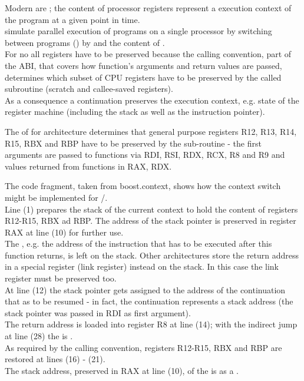 \label{mechanism}

Modern  are ; the content of
processor registers represent a execution context of the program at a given
point in time.\\
 simulate parallel execution of programs on a single
processor by switching between programs () by
 and  the content of .\\

For \cc no all registers have to be preserved because the calling convention,
part of the ABI, that covers how function's arguments and return values are
passed, determines which subset of CPU registers have to be preserved by the
called subroutine (scratch and callee-saved registers).\\

As a consequence a continuation preserves the execution context, e.g. state of
the register machine (including the stack as well as the instruction pointer).

The \cite{SYSVABI} of  for 
architecture determines that general purpose registers R12, R13, R14, R15, RBX
and RBP have to be preserved by the sub-routine - the first arguments are passed
to functions via RDI, RSI, RDX, RCX, R8 and R9 and values returned from
functions in RAX, RDX.\\


The code fragment, taken from boost.context\cite{bcontext}, shows how the
context switch might be implemented for /.\\
Line (1) prepares the stack of the current context to hold the content of
registers R12-R15, RBX ad RBP. The address of the stack pointer is preserved in
register RAX at line (10) for further use.\\
The , e.g. the address of the instruction that has to be
executed after this function returns, is left on the stack. Other architectures
store the return address in a special register (link register) instead on the
stack. In this case the link register must be preserved too.\\
At line (12) the stack pointer gets assigned to the address of the
continuation that as to be resumed - in fact, the continuation represents a
stack address (the stack pointer was passed in RDI as first argument).\\
The return address is loaded into register R8 at line (14); with the indirect
jump at line (28) the  is .\\
As required by the calling convention, registers R12-R15, RBX and RBP are
restored at lines (16) - (21).\\
The stack address, preserved in RAX at line (10), of the
 is  as a .\\

